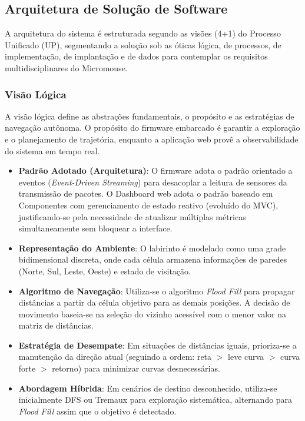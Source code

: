     \subsection{Arquitetura de Solução de Software}
    
    A arquitetura do sistema é estruturada segundo as visões (4+1) do Processo Unificado (UP), segmentando a solução sob as óticas lógica, de processos, de implementação, de implantação e de dados para contemplar os requisitos multidisciplinares do Micromouse.
    
    \subsubsection{Visão Lógica}
    A visão lógica define as abstrações fundamentais, o propósito e as estratégias de navegação autônoma. O propósito do firmware embarcado é garantir a exploração e o planejamento de trajetória, enquanto a aplicação web provê a observabilidade do sistema em tempo real.

\begin{itemize}
    \item \textbf{Padrão Adotado (Arquitetura)}: O firmware adota o padrão orientado a eventos (\textit{Event-Driven Streaming}) para desacoplar a leitura de sensores da transmissão de pacotes. O Dashboard web adota o padrão baseado em Componentes com gerenciamento de estado reativo (evoluído do MVC), justificando-se pela necessidade de atualizar múltiplas métricas simultaneamente sem bloquear a interface.
    \item \textbf{Representação do Ambiente}: O labirinto é modelado como uma grade bidimensional discreta, onde cada célula armazena informações de paredes (Norte, Sul, Leste, Oeste) e estado de visitação.
    \item \textbf{Algoritmo de Navegação}: Utiliza-se o algoritmo \textit{Flood Fill} para propagar distâncias a partir da célula objetivo para as demais posições. A decisão de movimento baseia-se na seleção do vizinho acessível com o menor valor na matriz de distâncias.
    \item \textbf{Estratégia de Desempate}: Em situações de distâncias iguais, prioriza-se a manutenção da direção atual (seguindo a ordem: reta $>$ leve curva $>$ curva forte $>$ retorno) para minimizar curvas desnecessárias.
    \item \textbf{Abordagem Híbrida}: Em cenários de destino desconhecido, utiliza-se inicialmente DFS ou Tremaux para exploração sistemática, alternando para \textit{Flood Fill} assim que o objetivo é detectado.
\end{itemize}

